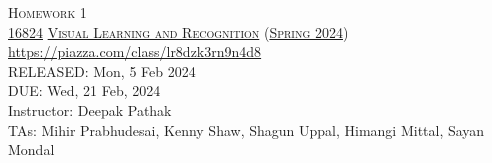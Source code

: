 \documentclass[11pt,addpoints,answers]{exam}
\title{\textsc{\hwName}} %
\author{}
\date{}
\date{}
\numberwithin{equation}{section} %
\numberwithin{figure}{section} %
\numberwithin{table}{section} %
\newcommand{\courseNum}{\href{https://visual-learning.cs.cmu.edu/}{16824}}
\newcommand{\courseName}{\href{https://visual-learning.cs.cmu.edu/}{Visual Learning and Recognition}}
\newcommand{\courseSem}{\href{https://visual-learning.cs.cmu.edu/}{Spring 2024}}
\newcommand{\courseUrl}{{\url{https://piazza.com/class/lr8dzk3rn9n4d8}}}
\newcommand{\hwNum}{Homework 1}
\newcommand{\hwTopic}{Image Classification and Object Detection}
\newcommand{\outDate}{{Mon, 5 Feb 2024}}
\newcommand{\dueDate}{{Wed, 21 Feb, 2024}}
\newcommand{\instructorName}{{Deepak Pathak}}
\newcommand{\taNames}{{Mihir Prabhudesai, Kenny Shaw, Shagun Uppal, Himangi Mittal, Sayan Mondal}}
\begin{document}
\section*{}
\begin{center}
  \textsc{\LARGE \hwNum} \\
  \vspace{1em}
  \textsc{\large \courseNum{} \courseName{} (\courseSem)} \\
  \courseUrl\\
  \vspace{1em}
  RELEASED: \outDate \\
  DUE: \dueDate \\
  Instructor: \instructorName \\
  TAs: \taNames
\end{center}
\end{document}
